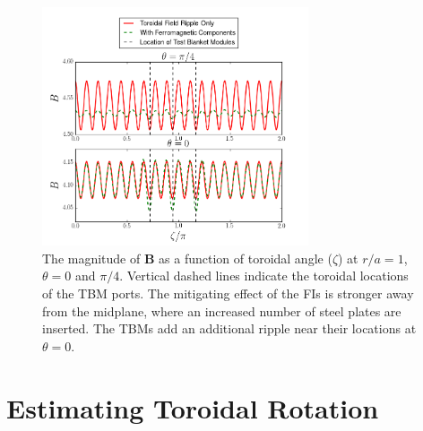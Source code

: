 \documentclass[aip, pop, preprint]{revtex4-1}
\numberwithin{figure}{section}
\numberwithin{equation}{section}
\begin{document}
\begin{figure}[h!]
\centering
\includegraphics[width=0.7\textwidth]{toroidalripple.png}
\caption{\label{fig:toroidalripple} The magnitude of $\bm{B}$ as a function of toroidal angle ($\zeta$) at $r/a = 1$, $\theta = 0$ and $\pi/4$. Vertical dashed lines indicate the toroidal locations of the TBM ports. The mitigating effect of the FIs is stronger away from the midplane, where an increased number of steel plates are inserted. The TBMs add an additional ripple near their locations at $\theta = 0$. }
\end{figure}

\FloatBarrier

\section{Estimating Toroidal Rotation}\label{rotation}
\end{document}
